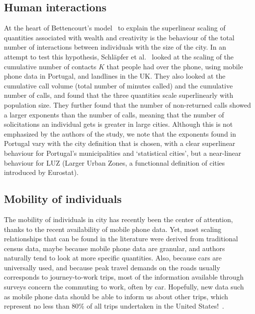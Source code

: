 \subsection{Human interactions}
\label{sub:human_interactions}

At the heart of Bettencourt's model~\cite{Bettencourt:2013} to explain the
superlinear scaling of quantities associated with wealth and creativity is the
behaviour of the total number of interactions between individuals with the size
of the city. In an attempt to test this hypothesis, Schl\"apfer et
al.~\cite{Schlapfer:2014} looked at the scaling of the cumulative number of
contacts $K$ that people had over the phone, using mobile phone data in
Portugal, and landlines in the UK. They also looked at the cumulative call
volume (total number of minutes called) and the cumulative number of calls, and
found that the three quantities scale superlinearly with population size. They
further found that the number of non-returned calls showed a larger exponents
than the number of calls, meaning that the number of solicitations an individual
gets is greater in large cities.
Although this is not emphasized by the authors of the study, we note that the
exponents found in Portugal vary with the city definition that is chosen, with a
clear superlinear behaviour for Portugal's municipalities and `statistical
cities', but a near-linear behaviour for LUZ (Larger Urban Zones, a functionnal
definition of cities introduced by Eurostat).


\subsection{Mobility of individuals}
\label{sub:mobility}

The mobility of individuals in city has recently been the center of attention,
thanks to the recent availability of mobile phone data. Yet, most scaling
relationships that can be found in the literature were derived from traditional
census data, maybe because mobile phone data are granular, and authors naturally
tend to look at more specific quantities.
Also, because cars are universally used, and because peak travel demands on the
roads usually corresponds to journey-to-work trips, most of the information
available through surveys concern the commuting to work, often by car.
Hopefully, new data such as mobile phone data should be able to inform us about
other trips, which represent no less than 80\% of all trips undertaken in the
United States!~\cite{FHWA-PL-11-022}.

